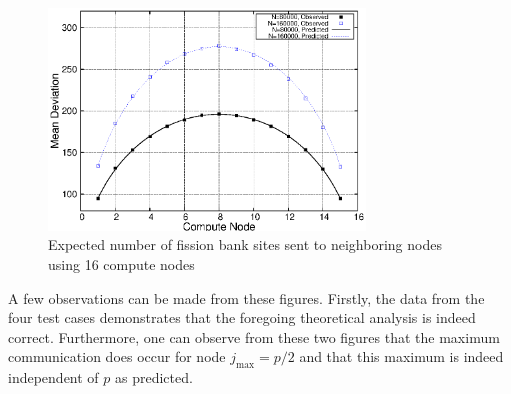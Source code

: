 \begin{figure}[ht]
  \centering
  \includegraphics[width=0.75\textwidth]{figures/mean_deviance/plot16.eps}
  \caption{Expected number of fission bank sites sent to neighboring
    nodes using 16 compute nodes}
  \label{fig:mean-deviance16}
\end{figure}

A few observations can be made from these figures. Firstly, the data
from the four test cases demonstrates that the foregoing theoretical
analysis is indeed correct. Furthermore, one can observe from these
two figures that the maximum communication does occur for node
$j_{\text{max}} = p/2$ and that this maximum is indeed independent of
$p$ as predicted.

